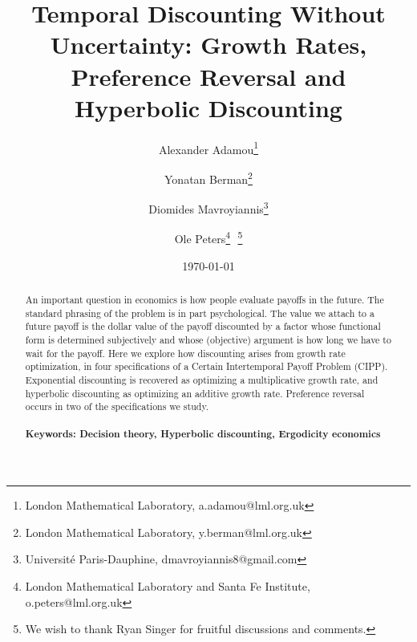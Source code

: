 \documentclass[11pt]{article}
\numberwithin{equation}{section}
\begin{document}
\begin{titlepage}
\title{Temporal Discounting Without Uncertainty: Growth Rates, Preference Reversal and Hyperbolic Discounting}
\author{Alexander Adamou\footnote{London Mathematical Laboratory, a.adamou@lml.org.uk} \and Yonatan Berman\footnote{London Mathematical Laboratory, y.berman@lml.org.uk} \and Diomides Mavroyiannis\footnote{Universit\'{e} Paris-Dauphine, dmavroyiannis8@gmail.com } \and Ole Peters\footnote{London Mathematical Laboratory and Santa Fe Institute, o.peters@lml.org.uk}\,\, \thanks{We wish to thank Ryan Singer for fruitful discussions and comments.}}
\date{\today}
\maketitle
\begin{abstract}
\noindent An important question in economics is how people evaluate payoffs in the future. The standard phrasing of the problem is in part psychological. The value we attach to a future payoff is the dollar value of the payoff discounted by a factor whose functional form is determined subjectively and whose (objective) argument is how long we have to wait for the payoff. Here we explore how discounting arises from growth rate optimization, in four specifications of a Certain Intertemporal Payoff Problem (CIPP). Exponential discounting is recovered as optimizing a multiplicative growth rate, and hyperbolic discounting as optimizing an additive growth rate. Preference reversal occurs in two of the specifications we study.
\\
\\
\noindent\textbf{Keywords: Decision theory, Hyperbolic discounting, Ergodicity economics}
\\


\end{abstract}
\end{titlepage}
\end{document}

